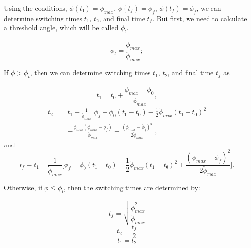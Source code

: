 \documentclass[letterpaper, paper,12pt]{AAS}		%
\begin{document}
	
	 Using the conditions, $\dot{\phi}(t_1)=\dot{\phi}_{max}$, $\dot{\phi}(t_f)=\dot{\phi}_f$, $\phi(t_f)=\phi_f$, we can determine switching times $t_1$, $t_2$, and final time $t_f$. But first, we need to calculate a threshold angle, which will be called $\phi_t$. 

	\begin{equation}\label{phi_t}
	\phi_t = \frac{\dot{\phi}_{max}}{\ddot{\phi}_{max}};
	\end{equation}
	
	If $\phi > \phi_t$, then we can determine switching times $t_1$, $t_2$, and final time $t_f$ as
	
	\begin{equation}\label{t1cons}
	t_1=t_0+\frac{\dot{\phi}_{max}-\dot{\phi}_0}{\ddot{\phi}_{max}},
	\end{equation}
	\begin{equation}\label{t2cons}
	\begin{split}
	t_2=&t_1+\frac{1}{\dot{\phi}_{max}}\Big[ \phi_f-\dot{\phi}_0(t_1-t_0)-\frac{1}{2}\ddot{\phi}_{max}(t_1-t_0)^2\\
	&-\frac{\dot{\phi}_{max}(\dot{\phi}_{max}-\dot{\phi}_f)}{\ddot{\phi}_{max}}+\frac{(\dot{\phi}_{max}-\dot{\phi}_f)^2}{2\ddot{\phi}_{max}} \Big],
	\end{split}
	\end{equation}
	and
	\begin{equation}\label{tfcons}
	t_f=t_1+\frac{1}{\dot{\phi}_{max}}\Big[ \phi_f-\dot{\phi}_0(t_1-t_0)-\frac{1}{2}\ddot{\phi}_{max}(t_1-t_0)^2+\frac{(\dot{\phi}_{max}-\dot{\phi}_f)^2}{2\ddot{\phi}_{max}} \Big].
	\end{equation}
	
	Otherwise, if $\phi \leq \phi_t$, then the switching times are determined by: 
	
	\begin{equation}\label{tfcons_phit}
	t_f = \sqrt{\frac{\dot{\phi}_{max}^2}{\ddot{\phi}_{max}}}
	\end{equation}
	\begin{equation}\label{t2cons_phit}
	t_2 = \frac{t_f}{2}
	\end{equation}
	\begin{equation}\label{t1cons_phit}
	t_1 = t_2 
	\end{equation}
	
\end{document}
